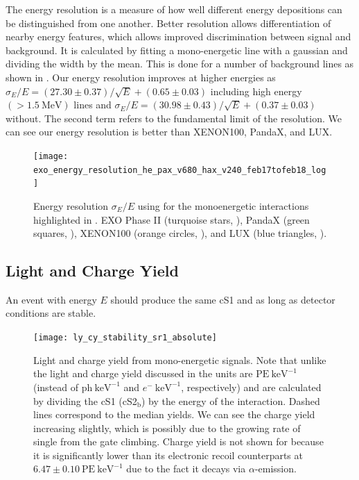 The energy resolution is a measure of how well different energy depositions can be distinguished from one another.  Better resolution
allows differentiation of nearby energy features, which allows improved discrimination between signal and background.  It is calculated
by fitting a mono-energetic \gammaray line with a gaussian and dividing the width by the mean.  This is done for a number of background
lines as shown in .  Our energy resolution improves at higher energies
as $\sigma_E / E = (27.30 \pm 0.37) / \sqrt{E} + (0.65 \pm 0.03)$ including high energy $(> 1.5\ \mathrm{MeV})$ lines and
$\sigma_E / E = (30.98 \pm 0.43) / \sqrt{E} + (0.37 \pm 0.03)$ without.  The second term refers to the fundamental limit of the
resolution.  We can see our energy resolution is better than XENON100, PandaX, and LUX.

\begin{figure}
\centering
\texttt{[image: exo\_energy\_resolution\_he\_pax\_v680\_hax\_v240\_feb17tofeb18\_log]}
\caption{Energy resolution $\sigma_E / E$ using for the monoenergetic interactions highlighted in
.  EXO Phase II (turquoise stars, ), PandaX (green
squares, ), XENON100 (orange circles, ), and LUX (blue triangles, ).}
\label{fig:calibrations_photon_charge_efficiences_ces}
\end{figure}



\subsection{Light and Charge Yield}
\label{subsec:det_char_ly_cy}
An event with energy $E$ should produce the same cS1 and \cstwob as long as detector conditions are stable.

\begin{figure}
\centering
\texttt{[image: ly\_cy\_stability\_sr1\_absolute]}
\caption{Light and charge yield from mono-energetic signals.  Note that unlike the light and charge yield discussed in
 the units are $\mathrm{PE\ keV^{-1}}$ (instead of $\mathrm{ph\ keV^{-1}}$ and
$e^-\ \mathrm{keV^{-1}}$, respectively) and are calculated by dividing the cS1 (cS2$_{\mathrm{b}}$) by the energy of the
interaction.  Dashed lines correspond to the median yields.  We can see the charge yield increasing slightly, which is possibly due to
the growing rate of single \electron from the gate climbing.  Charge yield is not shown for  because it is significantly
lower than its
electronic recoil counterparts at $6.47 \pm 0.10\ \mathrm{PE\ keV^{-1}}$ due to the fact it decays via $\alpha$-emission.}
\label{fig:calibrations_photon_charge_efficiences_ces_resolution}
\end{figure}



